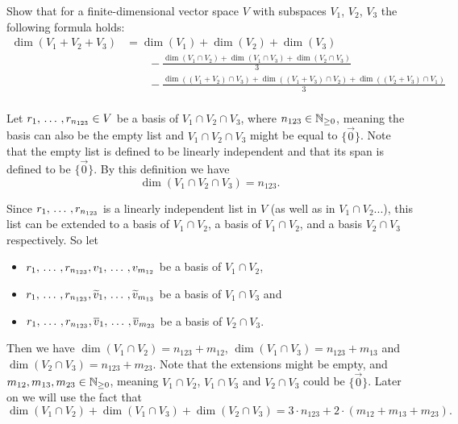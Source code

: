 \begin{xrcs}
  Show that for a finite-dimensional vector space $V$ with subspaces $V_1$, $V_2$, $V_3$ the following formula holds:
  \begin{equation}
  \begin{aligned}
    \dim (V_1 + V_2 + V_3)  &= \dim (V_1) + \dim (V_2) + \dim (V_3) \\
    & \qquad - \frac{\dim (V_1 \cap V_2) + \dim (V_1 \cap V_3) + \dim (V_2 \cap V_3)}{3} \\
    & \qquad - \frac{ \dim \left(  (V_1 + V_2) \cap V_3 \right) + \dim \left( (V_1 + V_3) \cap V_2 \right)+ \dim \left( (V_2 + V_3) \cap V_1 \right) }{3} \\
  \end{aligned}
\end{equation}

 Let $r_1, {\, \ldots \,\,}, r_{n_{123}} \in V$ be a basis of $V_1 \cap V_2 \cap V_3$, where $n_{123} \in \mathbb{N}_{\geq 0}$, meaning the basis can also be the empty list and $V_1 \cap V_2 \cap V_3$ might be equal to $\{\vec 0\}$. Note that the empty list is defined to be linearly independent and that its span is defined to be $\{\vec 0\}$. By this definition we have
\[
\dim (V_1 \cap V_2 \cap V_3) = n_{123}.
\]

Since $r_1, {\, \ldots \,\,}, r_{n_{123}}$ is a linearly independent list in $V$ (as well as in $V_1 \cap V_2$...), this list can be extended to a basis of $V_1 \cap V_2$, a basis of $V_1 \cap V_2$, and a basis $V_2 \cap V_3$ respectively. So let
\begin{itemize}
  \item $r_1, {\, \ldots \,\,}, r_{n_{123}}, v_1, {\, \ldots \,\,}, v_{m_{12}}$ be a basis of $V_1 \cap V_2$,
  \item $r_1, {\, \ldots \,\,}, r_{n_{123}}, \widetilde{v}_1, {\, \ldots \,\,}, \widetilde{v}_{m_{13}}$ be a basis of $V_1 \cap V_3$ and
  \item $r_1, {\, \ldots \,\,}, r_{n_{123}}, \overline{v}_1, {\, \ldots \,\,}, \overline{v}_{m_{23}}$ be a basis of $V_2 \cap V_3$.
\end{itemize}

Then we have $\dim (V_1 \cap V_2) = n_{123} + m_{12}$, $\dim (V_1 \cap V_3) = n_{123} + m_{13}$ and $\dim (V_2 \cap V_3) = n_{123} + m_{23}$. Note that the extensions might be empty, and $m_{12}, m_{13}, m_{23} \in \mathbb{N}_{\geq 0}$, meaning $V_1 \cap V_2$, $V_1 \cap V_3$ and $V_2 \cap V_3$ could be $\{ \vec 0 \}$. Later on we will use the fact that
\begin{equation}
  \label{eq: fact for dim}
  \dim (V_1 \cap V_2) + \dim (V_1 \cap V_3) + \dim (V_2 \cap V_3) = 3\cdot n_{123} + 2\cdot (m_{12} + m_{13} + m_{23}).
\end{equation}


\end{xrcs}
